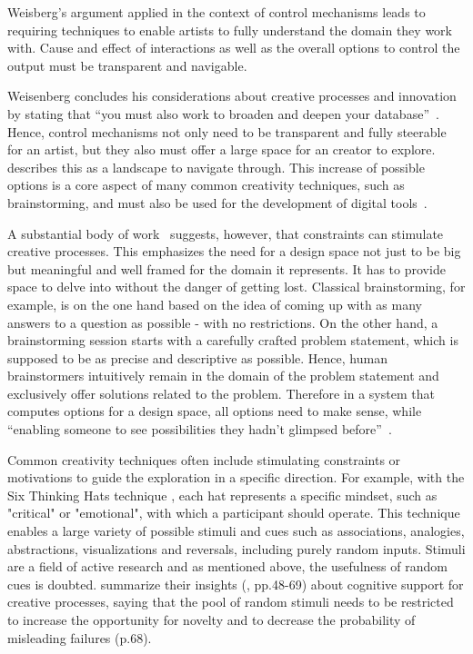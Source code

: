Weisberg's argument applied in the context of control mechanisms leads to requiring techniques to enable artists to fully understand the domain they work with. Cause and effect of interactions as well as the overall options to control the output must be transparent and navigable.

Weisenberg concludes his considerations about creative processes and innovation by stating that ``you must also work to broaden and deepen your database''~\cite{markman_2009_tis}. Hence, control mechanisms not only need to be transparent and fully steerable for an artist, but they also must offer a large space for an creator to explore. \citeauthor*{boden_2010_cat}~\cite{boden_2010_cat} describes this as a landscape to navigate through. This increase of possible options is a core aspect of many common creativity techniques, such as brainstorming, and must also be used for the development of digital tools~\cite{terry_2004_vea}.

A substantial body of work~\cite{onarheim_2010_occ,shih_2011_buc,biskjaer_2014_cud,stokes_2005_ccp} suggests, however, that constraints can stimulate creative processes. This 
emphasizes the need for a design space not just to be big but meaningful and well framed for the domain it represents. It has to provide space to delve into without the danger of getting lost. Classical brainstorming, for example, is on the one hand based on the idea of coming up with as many answers to a question as possible - with no restrictions. On the other hand, a brainstorming session starts with a carefully crafted problem statement, which is supposed to be as precise and descriptive as possible. Hence, human brainstormers intuitively remain in the domain of the problem statement and exclusively offer solutions related to the problem. Therefore in a system that computes options for a design space, all options need to make sense, while ``enabling someone to see possibilities they hadn't glimpsed before''~\cite{boden_2010_cat}. 

Common creativity techniques often include stimulating constraints or motivations to guide the exploration in a specific direction. For example, with the Six Thinking Hats technique \cite{debono_1985_sth}, each hat represents a specific mindset, such as "critical" or "emotional", with which a participant should operate. This technique enables a large variety of possible stimuli and cues such as associations, analogies, abstractions, visualizations and reversals, including purely random inputs. Stimuli are a field of active research and as mentioned above, the usefulness of random cues is doubted. \citeauthor*{markman_2009_tis} summarize their insights (\cite{markman_2009_tis}, pp.48-69) about cognitive support for creative processes, saying that the pool of random stimuli needs to be restricted to increase the opportunity for novelty and to decrease the probability of misleading failures (p.68).

